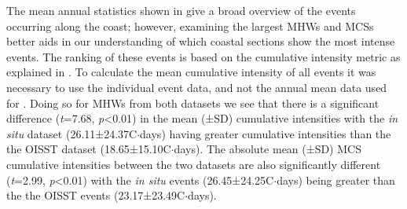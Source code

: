 \documentclass[a4paper,10pt,review]{elsarticle}
\begin{document}
The mean annual statistics shown in  give a broad overview of the events occurring along the coast; however, examining the largest MHWs and MCSs better aids in our understanding of which coastal sections show the most intense events. The ranking of these events is based on the cumulative intensity metric as explained in . To calculate the mean cumulative intensity of all events it was necessary to use the individual event data, and not the annual mean data used for . Doing so for MHWs from both datasets we see that there is a significant difference (\emph{t}=7.68, \emph{p}<0.01) in the mean (±SD) cumulative intensities with the \emph{in situ} dataset (26.11±24.37\degree C$\cdot$days) having greater cumulative intensities than the the OISST dataset (18.65±15.10\degree C$\cdot$days). The absolute mean (±SD) MCS cumulative intensities between the two datasets are also significantly different (\emph{t}=2.99, \emph{p}<0.01) with the \emph{in situ} events (26.45±24.25\degree C$\cdot$days) being greater than the the OISST events (23.17±23.49\degree C$\cdot$days).
\end{document}
